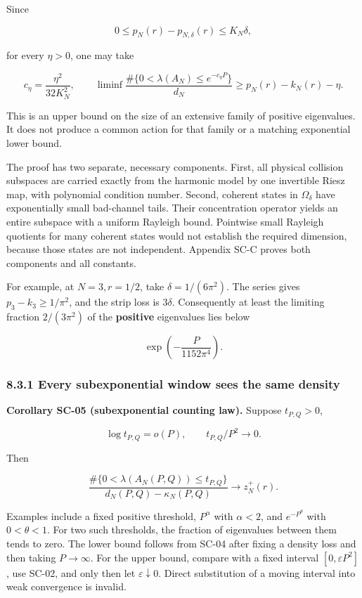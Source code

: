 \documentclass[a4paper,11pt]{article}
\numberwithin{equation}{section}
\begin{document}
Since

\[
0\leq p_N(r)-p_{N,\delta}(r)\leq K_N\delta,
\]

for every \(\eta>0\), one may take

\[
c_\eta=\frac{\eta^2}{32K_N^2},\qquad
\liminf\frac{\#\{0<\lambda(A_N)\leq e^{-c_\eta P}\}}{d_N}
\geq p_N(r)-k_N(r)-\eta.
\]

This is an upper bound on the size of an extensive family of positive eigenvalues. It does not produce a common action for that family or a matching exponential lower bound.

The proof has two separate, necessary components. First, all physical collision subspaces are carried exactly from the harmonic model by one invertible Riesz map, with polynomial condition number. Second, coherent states in \(\Omega_\delta\) have exponentially small bad-channel tails. Their concentration operator yields an entire subspace with a uniform Rayleigh bound. Pointwise small Rayleigh quotients for many coherent states would not establish the required dimension, because those states are not independent. Appendix SC-C proves both components and all constants.

For example, at \(N=3,r=1/2\), take \(\delta=1/(6\pi^2)\). The series gives \(p_3-k_3\geq1/\pi^2\), and the strip loss is \(3\delta\). Consequently at least the limiting fraction \(2/(3\pi^2)\) of the \textbf{positive} eigenvalues lies below

\[
\exp\!\left(-\frac{P}{1152\pi^4}\right).
\]

\hypertarget{every-subexponential-window-sees-the-same-density}{%
\subsubsection{8.3.1 Every subexponential window sees the same density}\label{every-subexponential-window-sees-the-same-density}}

\textbf{Corollary SC-05 (subexponential counting law).} Suppose \(t_{P,Q}>0\),

\[
\log t_{P,Q}=o(P),\qquad t_{P,Q}/P^2\longrightarrow0.
\]

Then

\[
\frac{\#\{0<\lambda(A_N(P,Q))\leq t_{P,Q}\}}
{d_N(P,Q)-\kappa_N(P,Q)}\longrightarrow z_N^+(r).
\]

Examples include a fixed positive threshold, \(P^\alpha\) with \(\alpha<2\), and \(e^{-P^\theta}\) with \(0<\theta<1\). For two such thresholds, the fraction of eigenvalues between them tends to zero. The lower bound follows from SC-04 after fixing a density loss and then taking \(P\to\infty\). For the upper bound, compare with a fixed interval \([0,\varepsilon P^2]\), use SC-02, and only then let \(\varepsilon\downarrow0\). Direct substitution of a moving interval into weak convergence is invalid.
\end{document}
